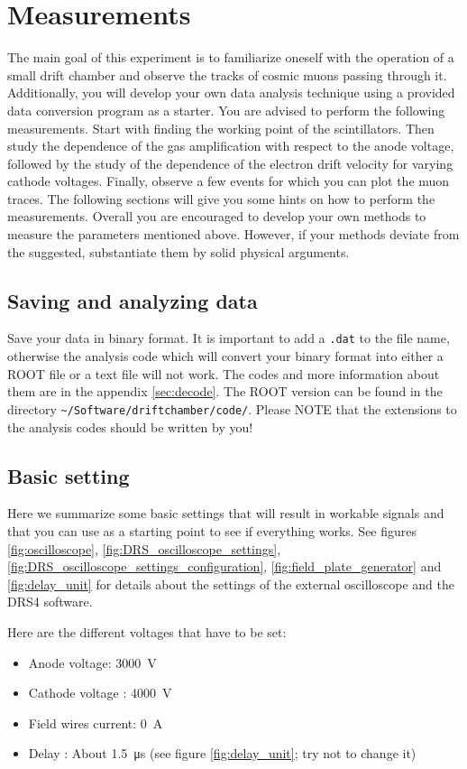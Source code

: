 \documentclass[12pt]{article}
\begin{document}
\section{Measurements}
The main goal of this experiment is to familiarize oneself with the operation of a small drift chamber and observe the tracks of cosmic muons passing through it. Additionally, you will develop your own data analysis technique using a provided data conversion program as a starter. You are advised to perform the following measurements. Start with finding the working point of the scintillators. Then study the dependence of the gas amplification with respect to the anode voltage, followed by the study of the dependence of the electron drift velocity for varying cathode voltages. Finally, observe a few events for which you can plot the muon traces. The following sections will give you some hints on how to perform the measurements. Overall you are encouraged to develop your own methods to measure the parameters mentioned above. However, if your methods deviate from the suggested, substantiate them by solid physical arguments. 

\subsection{Saving and analyzing data}
Save your data in binary format. It is important to add a \verb|.dat| to the file name, otherwise the analysis code which will convert your binary format into either a ROOT file or a text file will not work. The codes and more information about them are in the appendix \ref{sec:decode}. The ROOT version can be found in the directory \verb|~/Software/driftchamber/code/|. Please NOTE that the extensions to the analysis codes should be written by you! 

\subsection{Basic setting}
Here we summarize some basic settings that will result in workable signals and that you can use as a starting point to see if everything works. See figures \ref{fig:oscilloscope}, \ref{fig:DRS_oscilloscope_settings}, \ref{fig:DRS_oscilloscope_settings_configuration}, \ref{fig:field_plate_generator} and \ref{fig:delay_unit} for details about the settings of the external oscilloscope and the DRS4 software.

Here are the different voltages that have to be set:

\begin{itemize}
    \item Anode voltage: \SI{3000}{\volt}
    \item Cathode voltage : \SI{4000}{\volt}
    \item Field wires current: \SI{0}{A}
    \item Delay : About \SI{1.5}{\micro\second} (see figure \ref{fig:delay_unit}; try not to change it)
\end{itemize}
\end{document}
